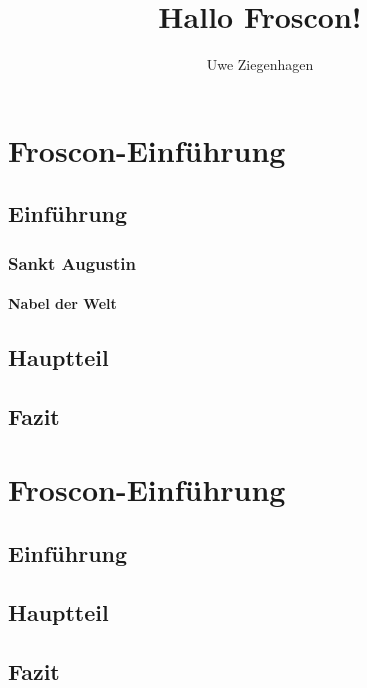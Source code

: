 \documentclass[ngerman]{scrbook}
\title{Hallo Froscon!}
\author{Uwe Ziegenhagen}
\begin{document}
\maketitle

\tableofcontents

\chapter{Froscon-Einführung}

\section{Einführung}

\subsection{Sankt Augustin}

\subsubsection{Nabel der Welt}


\blindtext[25]

\section{Hauptteil}

\blindtext[25]


\section{Fazit}

\blindtext[25]


\chapter{Froscon-Einführung}

\section{Einführung}

\blindtext[25]

\section{Hauptteil}

\blindtext[25]


\section{Fazit}
\end{document}
